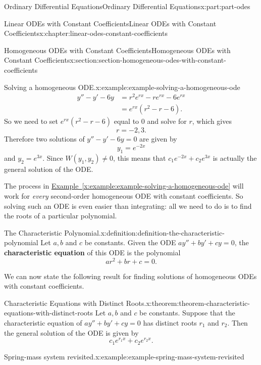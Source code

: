 \documentclass[twoside,10pt,]{book}
\newcommand{\xreffont}{\relax}
\newcommand{\terminology}[1]{\textbf{#1}}
\numberwithin{equation}{part}
\newcommand{\amp}{&}
\begin{document}
\begin{partptx}{Ordinary Differential Equations}{}{Ordinary Differential Equations}{}{}{x:part:part-odes}
\begin{chapterptx}{Linear ODEs with Constant Coefficients}{}{Linear ODEs with Constant Coefficients}{}{}{x:chapter:linear-odes-constant-coefficients}
\begin{sectionptx}{Homogeneous ODEs with Constant Coefficients}{}{Homogeneous ODEs with Constant Coefficients}{}{}{x:section:section-homogeneous-odes-with-constant-coefficients}
\begin{example}{Solving a homogeneous ODE.}{x:example:example-solving-a-homogeneous-ode}
%
\begin{align*}
y''- y' - 6y \amp = r^{2}e^{rx} - re^{rx} - 6e^{rx} \\
\amp = e^{rx}(r^{2} - r - 6). 
\end{align*}
So we need to set \(e^{rx}(r^{2} - r - 6)\) equal to \(0\) and solve for \(r\), which gives%
\begin{equation*}
r = -2, 3.
\end{equation*}
Therefore two solutions of \(y'' - y' - 6y = 0\) are given by%
\begin{equation*}
y_{1} = e^{-2x}
\end{equation*}
and \(y_{2} = e^{3x}\). Since \(W(y_{1},y_{2})\neq0\), this means that \(c_{1}e^{-2x} + c_{2}e^{3x}\) is actually the general solution of the ODE.%
\end{example}
The process in \hyperref[x:example:example-solving-a-homogeneous-ode]{Example~{\xreffont\ref{x:example:example-solving-a-homogeneous-ode}}} will work for \emph{every} second-order homogeneous ODE with constant coefficients. So solving such an ODE is even easier than integrating: all we need to do is to find the roots of a particular polynomial.%
\begin{definition}{The Characteristic Polynomial.}{x:definition:definition-the-characteristic-polynomial}%
%
Let \(a,b\) and \(c\) be constants. Given the ODE \(ay'' + by' + cy = 0\), the \terminology{characteristic equation} of this ODE is the polynomial%
\begin{equation*}
ar^{2} + br + c = 0.
\end{equation*}
%
\end{definition}
We can now state the following result for finding solutions of homogeneous ODEs with constant coefficients.%
\begin{theorem}{Characteristic Equations with Distinct Roots.}{}{x:theorem:theorem-characteristic-equations-with-distinct-roots}%
Let \(a,b\) and \(c\) be constants. Suppose that the characteristic equation of \(ay'' + by' + cy = 0\) has distinct roots \(r_{1}\) and \(r_{2}\). Then the general solution of the ODE is given by%
\begin{equation*}
c_{1}e^{r_{1}x} + c_{2}e^{r_{2}x}.
\end{equation*}
%
\end{theorem}
\begin{example}{Spring-mass system revisited.}{x:example:example-spring-mass-system-revisited}%

\end{example}
\end{sectionptx}
\end{chapterptx}
\end{partptx}
\end{document}
